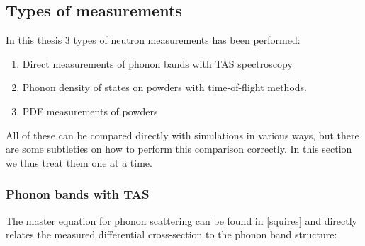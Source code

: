\subsection{Types of measurements}
In this thesis 3 types of neutron measurements has been performed:

\begin{enumerate}
	\item Direct measurements of phonon bands with TAS spectroscopy
	\item Phonon density of states on powders with time-of-flight methods.
	\item PDF measurements of powders
\end{enumerate}

\noindent All of these can be compared directly with simulations in various ways, but there are some subtleties on how to perform this comparison correctly. In this section we thus treat them one at a time.

\subsubsection{Phonon bands with TAS}
The master equation for phonon scattering can be found in [squires] and directly relates the measured differential cross-section to the phonon band structure:

